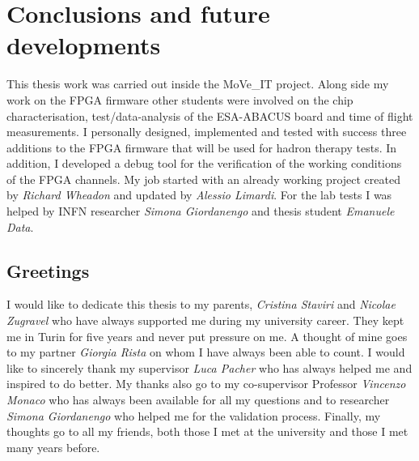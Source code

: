 \chapter*{Conclusions and future developments}
\pagestyle{plain}
\noindent This thesis work was carried out inside the MoVe\_IT project. Along side my work on the FPGA firmware other students were involved on the chip characterisation, test/data-analysis of the ESA-ABACUS board and time of flight measurements.
I personally designed, implemented and tested with success three additions to the FPGA firmware that will be used for hadron therapy tests.
In addition, I developed a debug tool for the verification of the working conditions of the FPGA channels.
My job started with an already working project created by \textit{Richard Wheadon} and updated by \textit{Alessio Limardi}.
For the lab tests I was helped by INFN researcher \textit{Simona Giordanengo} and thesis student \textit{Emanuele Data}.




\section*{Greetings}
I would like to dedicate this thesis to my parents, \textit{Cristina Staviri} and \textit{Nicolae Zugravel} who have always supported me during my university career.
They kept me in Turin for five years and never put pressure on me.
A thought of mine goes to my partner \textit{Giorgia Rista} on whom I have always been able to count.
I would like to sincerely thank my supervisor \textit{Luca Pacher} who has always helped me and inspired to do better.
My thanks also go to my co-supervisor Professor \textit{Vincenzo Monaco} who has always been available for all my questions and to researcher \textit{Simona Giordanengo} who helped me for the validation process.
Finally, my thoughts go to all my friends, both those I met at the university and those I met many years before.